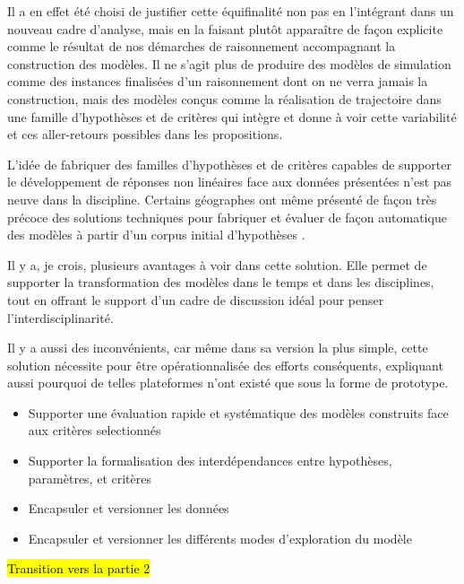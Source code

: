 Il a en effet été choisi de justifier cette équifinalité non pas en l'intégrant dans un nouveau cadre d'analyse, mais en la faisant plutôt apparaître de façon explicite comme le résultat de nos démarches de raisonnement accompagnant la construction des modèles. Il ne s'agit plus de produire des modèles de simulation comme des instances finalisées d'un raisonnement dont on ne verra jamais la construction, mais des modèles conçus comme la réalisation de trajectoire dans une famille d'hypothèses et de critères qui intègre et donne à voir cette variabilité et ces aller-retours possibles dans les propositions.

L'idée de fabriquer des familles d'hypothèses et de critères capables de supporter le développement de réponses non linéaires face aux données présentées n'est pas neuve dans la discipline. Certains géographes ont même présenté de façon très précoce des solutions techniques pour fabriquer et évaluer de façon automatique des modèles à partir d'un corpus initial d'hypothèses \autocite{Openshaw1988}.

Il y a, je crois, plusieurs avantages à voir dans cette solution.  Elle permet de supporter la transformation des modèles dans le temps et dans les disciplines, tout en offrant le support d'un cadre de discussion idéal pour penser l'interdisciplinarité.

Il y a aussi des inconvénients, car même dans sa version la plus simple, cette solution nécessite pour être opérationnalisée des efforts conséquents, expliquant aussi pourquoi de telles plateformes n'ont existé que sous la forme de prototype.

\begin{itemize}
\item Supporter une évaluation rapide et systématique des modèles construits face aux critères selectionnés
\item Supporter la formalisation des interdépendances entre hypothèses, paramètres, et critères
\item Encapsuler et versionner les données
\item Encapsuler et versionner les différents modes d'exploration du modèle
\end{itemize}

\hl{Transition vers la partie 2}


